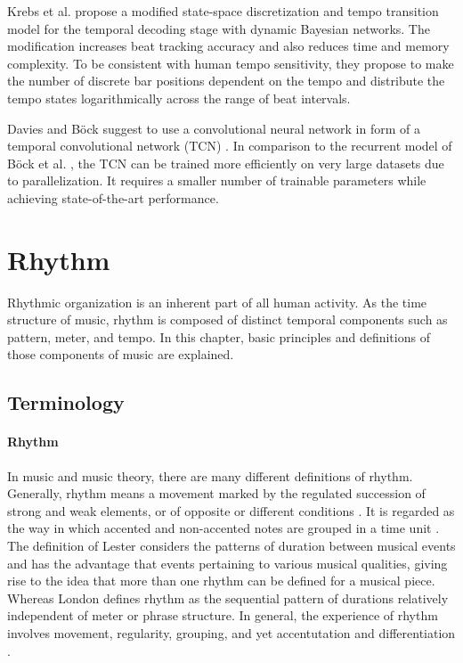 \documentclass{scrartcl}
\begin{document}
Krebs et al. \cite{Krebs2015} propose a modified state-space discretization and tempo transition model for the temporal decoding stage with dynamic Bayesian networks. The modification increases beat tracking accuracy and also reduces time and memory complexity. To be consistent with human tempo sensitivity, they propose to make the number of discrete bar positions dependent on the tempo and distribute the tempo states logarithmically across the range of beat intervals. 

Davies and Böck \cite{Davies2019} suggest to use a convolutional neural network in form of a temporal convolutional network (TCN) \cite{Bai2018}. In comparison to the recurrent model of Böck et al. \cite{Boeck2014}, the TCN can be trained more efficiently on very large datasets due to parallelization. It requires a smaller number of trainable parameters while achieving state-of-the-art performance. 



\newpage
\section{Rhythm}
\label{sec:rhyhtm}

Rhythmic organization is an inherent part of all human activity. As the time structure of music, rhythm is composed of distinct temporal components such as pattern, meter, and tempo. In this chapter, basic principles and definitions of those components of music are explained.  


\subsection{Terminology}

\paragraph{Rhythm} 
In music and music theory, there are many different definitions of rhythm. Generally, rhythm means a movement marked by the regulated succession of strong and weak elements, or of opposite or different conditions \cite{Dictionary1971}. It is regarded as the way in which accented and non-accented notes are grouped in a time unit \cite{Cooper1966}. The definition of Lester \cite{Lester1986} considers the patterns of duration between musical events and has the advantage that events pertaining to various musical qualities, giving rise to the idea that more than one rhythm can be defined for a musical piece. Whereas London \cite{London2001} defines rhythm as the sequential pattern of durations relatively independent of meter or phrase structure. In general, the experience of rhythm involves movement, regularity, grouping, and yet accentutation and differentiation \cite{Handel1989}.
\end{document}
